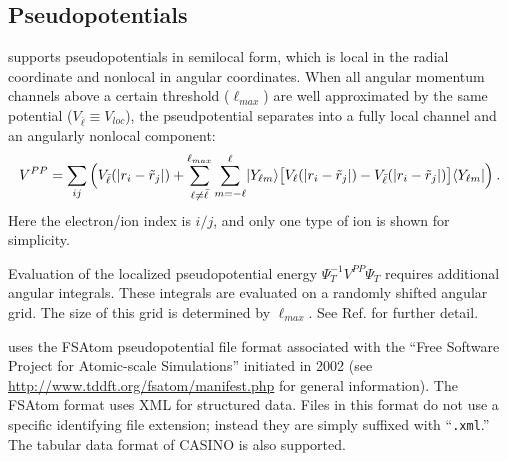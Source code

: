 \subsection{Pseudopotentials}
\label{sec:nlpp}
\qmcpack supports pseudopotentials in semilocal form, which is local in the radial coordinate and nonlocal in angular coordinates.  When all angular momentum channels above a certain threshold ($\ell_{max}$) are well approximated by the same potential ($V_{\bar{\ell}}\equiv V_{loc}$), the pseudpotential separates into a fully local channel and an angularly nonlocal component:
\begin{align}
  V^{PP} = \sum_{ij}\Big(V_{\bar{\ell}}(\abs{r_i-\tilde{r}_j}) + \sum_{\ell\ne\bar{\ell}}^{\ell_{max}}\sum_{m=-\ell}^\ell \operator{Y_{\ell m}}{\big[V_\ell(\abs{r_i-\tilde{r}_j}) - V_{\bar{\ell}}(\abs{r_i-\tilde{r}_j}) \big]}{Y_{\ell m}} \Big)\:.
\end{align}  
Here the electron/ion index is $i/j$, and only one type of ion is shown for simplicity.

Evaluation of the localized pseudopotential energy $\Psi_T^{-1}V^{PP}\Psi_T$ requires additional angular integrals.  These integrals are evaluated on a randomly shifted angular grid.  The size of this grid is determined by $\ell_{max}$.  See Ref. \cite{Mitas1991} for further detail. 

\qmcpack uses the FSAtom pseudopotential file format associated with the ``Free Software Project for Atomic-scale Simulations'' initiated in 2002  (see \url{http://www.tddft.org/fsatom/manifest.php} for general information).  The FSAtom format uses XML for structured data.  Files in this format do not use a specific identifying file extension; instead they are simply suffixed with ``\texttt{.xml}.''  The tabular data format of CASINO is also supported.





